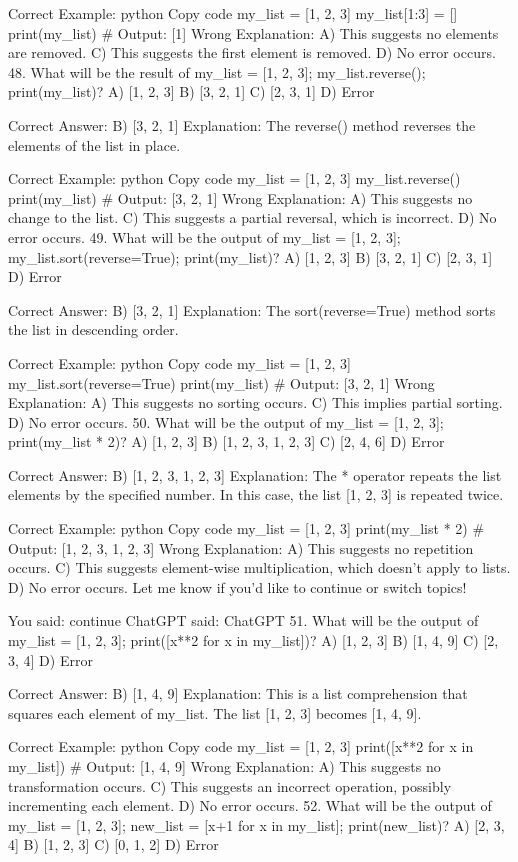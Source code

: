 Correct Example:
python
Copy code
my_list = [1, 2, 3]
my_list[1:3] = []
print(my_list)  # Output: [1]
Wrong Explanation:
A) This suggests no elements are removed.
C) This suggests the first element is removed.
D) No error occurs.
48. What will be the result of my_list = [1, 2, 3]; my_list.reverse(); print(my_list)?
A) [1, 2, 3]
B) [3, 2, 1]
C) [2, 3, 1]
D) Error

Correct Answer: B) [3, 2, 1]
Explanation: The reverse() method reverses the elements of the list in place.

Correct Example:
python
Copy code
my_list = [1, 2, 3]
my_list.reverse()
print(my_list)  # Output: [3, 2, 1]
Wrong Explanation:
A) This suggests no change to the list.
C) This suggests a partial reversal, which is incorrect.
D) No error occurs.
49. What will be the output of my_list = [1, 2, 3]; my_list.sort(reverse=True); print(my_list)?
A) [1, 2, 3]
B) [3, 2, 1]
C) [2, 3, 1]
D) Error

Correct Answer: B) [3, 2, 1]
Explanation: The sort(reverse=True) method sorts the list in descending order.

Correct Example:
python
Copy code
my_list = [1, 2, 3]
my_list.sort(reverse=True)
print(my_list)  # Output: [3, 2, 1]
Wrong Explanation:
A) This suggests no sorting occurs.
C) This implies partial sorting.
D) No error occurs.
50. What will be the output of my_list = [1, 2, 3]; print(my_list * 2)?
A) [1, 2, 3]
B) [1, 2, 3, 1, 2, 3]
C) [2, 4, 6]
D) Error

Correct Answer: B) [1, 2, 3, 1, 2, 3]
Explanation: The * operator repeats the list elements by the specified number. In this case, the list [1, 2, 3] is repeated twice.

Correct Example:
python
Copy code
my_list = [1, 2, 3]
print(my_list * 2)  # Output: [1, 2, 3, 1, 2, 3]
Wrong Explanation:
A) This suggests no repetition occurs.
C) This suggests element-wise multiplication, which doesn't apply to lists.
D) No error occurs.
Let me know if you'd like to continue or switch topics!






You said:
continue
ChatGPT said:
ChatGPT
51. What will be the output of my_list = [1, 2, 3]; print([x**2 for x in my_list])?
A) [1, 2, 3]
B) [1, 4, 9]
C) [2, 3, 4]
D) Error

Correct Answer: B) [1, 4, 9]
Explanation: This is a list comprehension that squares each element of my_list. The list [1, 2, 3] becomes [1, 4, 9].

Correct Example:
python
Copy code
my_list = [1, 2, 3]
print([x**2 for x in my_list])  # Output: [1, 4, 9]
Wrong Explanation:
A) This suggests no transformation occurs.
C) This suggests an incorrect operation, possibly incrementing each element.
D) No error occurs.
52. What will be the output of my_list = [1, 2, 3]; new_list = [x+1 for x in my_list]; print(new_list)?
A) [2, 3, 4]
B) [1, 2, 3]
C) [0, 1, 2]
D) Error

